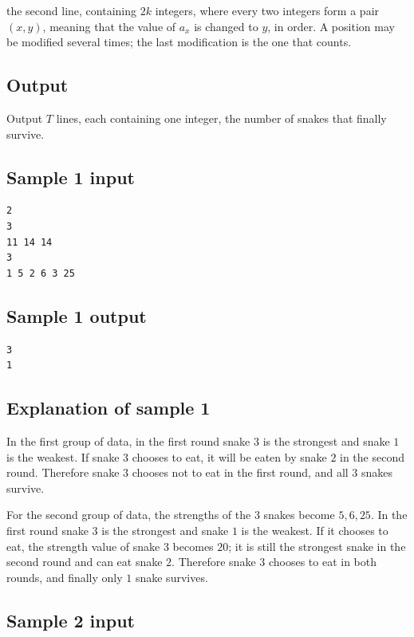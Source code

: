 \documentclass[11pt]{article}
\begin{document}
the second line, containing $2k$ integers, where every two integers form a
pair $(x, y)$, meaning that the value of $a_x$ is changed to $y$, in order.
A position may be modified several times; the last modification is the one
that counts.

\subsection*{Output}

Output $T$ lines, each containing one integer, the number of snakes that
finally survive.

\subsection*{Sample 1 input}

\begin{verbatim}
2
3
11 14 14
3
1 5 2 6 3 25
\end{verbatim}

\subsection*{Sample 1 output}

\begin{verbatim}
3
1
\end{verbatim}

\subsection*{Explanation of sample 1}

In the first group of data, in the first round snake $3$ is the strongest and
snake $1$ is the weakest.
If snake $3$ chooses to eat, it will be eaten by snake $2$ in the second
round.
Therefore snake $3$ chooses not to eat in the first round, and all $3$ snakes
survive.

For the second group of data, the strengths of the $3$ snakes become
$5, 6, 25$.
In the first round snake $3$ is the strongest and snake $1$ is the weakest.
If it chooses to eat, the strength value of snake $3$ becomes $20$;
it is still the strongest snake in the second round and can eat snake $2$.
Therefore snake $3$ chooses to eat in both rounds, and finally only $1$ snake
survives.

\subsection*{Sample 2 input}
\end{document}
